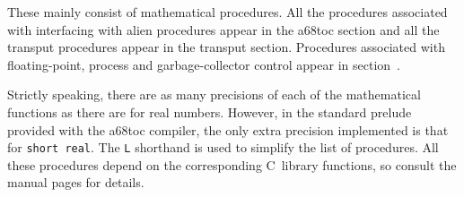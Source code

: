 These mainly consist of mathematical procedures. All the procedures
associated with interfacing with alien procedures appear in the a68toc
section and all the transput procedures appear in the transput section.
Procedures associated with floating-point, process and
garbage-collector control appear in section~.

Strictly speaking, there are as many precisions of each of the
mathematical functions as there are for real numbers. However, in the
standard prelude provided with the a68toc compiler, the only extra
precision implemented is that for \verb|short real|. The \verb|L|
shorthand is used to simplify the list of procedures. All these
procedures depend on the corresponding C~library functions, so consult
the manual pages for details.
